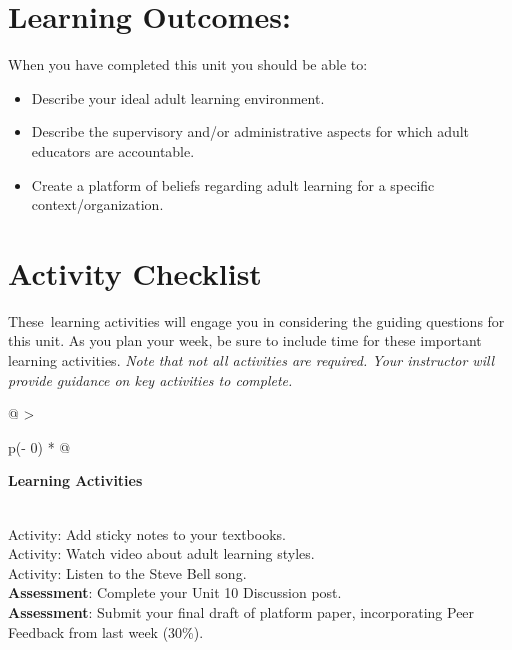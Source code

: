 \documentclass[
]{book}
\begin{document}
\hypertarget{learning-outcomes-9}{%
\section*{Learning Outcomes:}\label{learning-outcomes-9}}

When you have completed this unit you should be able to:

\begin{itemize}
\item
  Describe your ideal adult learning environment.
\item
  Describe the supervisory and/or administrative aspects for which
  adult educators are accountable.
\item
  Create a platform of beliefs regarding adult learning for a specific
  context/organization.
\end{itemize}

\hypertarget{activity-checklist-9}{%
\section*{Activity Checklist}\label{activity-checklist-9}}

These~learning activities will engage you in considering the guiding questions for this unit. As you plan your week, be sure to include time for these important learning activities. \emph{Note that not all activities are required. Your instructor will provide guidance on key activities to complete.}

\begin{longtable}[]{@{}
  >{\raggedright\arraybackslash}p{(\columnwidth - 0\tabcolsep) * }@{}}
\toprule
\begin{minipage}[b]{\linewidth}\raggedright
\textbf{Learning Activities}
\end{minipage} \\
\midrule
\endhead
Activity: Add sticky notes to your textbooks. \\
Activity: Watch video about adult learning styles. \\
Activity: Listen to the Steve Bell song. \\
\textbf{Assessment}: Complete your Unit 10 Discussion post. \\
\textbf{Assessment}: Submit your final draft of platform paper, incorporating Peer Feedback from last week (30\%). \\
\bottomrule
\end{longtable}
\end{document}
